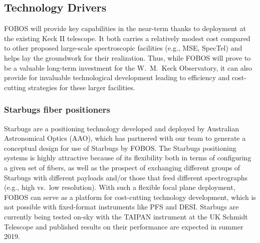 

\subsection{Technology Drivers}
\label{sec:design}

FOBOS will provide key capabilities in the near-term thanks to
deployment at the existing Keck II telescope. It both carries a
relatively modest cost compared to other proposed large-scale
spectroscopic facilities (e.g., MSE, SpecTel) and helps lay the
groundwork for their realization. Thus, while FOBOS will prove to be
a valuable long-term investment for the W.~M.~Keck Observatory, it
can also provide for invaluable technological development leading to
efficiency and cost-cutting strategies for these larger facilities.

\subsubsection{Starbugs fiber positioners} Starbugs are a positioning
technology developed and deployed by Australian Astronomical Optics (AAO), which has partnered with our team to
generate a conceptual design for use of Starbugs by FOBOS. The Starbugs positioning systems is highly attractive
because of its flexibility both in terms of configuring a given set of fibers, as well as the prospect of exchanging
different groups of Starbugs with different payloads and/or those that feed different spectrographs (e.g., high vs.\
low resolution). With such a flexible focal plane deployment, FOBOS can serve as a platform for cost-cutting technology
development, which is not possible with fixed-format instruments like PFS and DESI. Starbugs are currently being tested
on-sky with the TAIPAN instrument at the UK Schmidt Telescope and published results on their performance are expected
in summer 2019.


